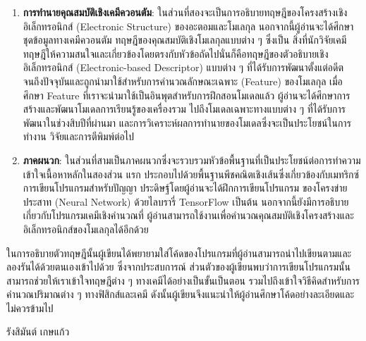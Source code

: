{\begin{enumerate}
    \item \textbf{การทำนายคุณสมบัติเชิงเคมีควอนตัม}: ในส่วนที่สองจะเป็นการอธิบายทฤษฎีของโครงสร้างเชิงอิเล็กทรอนิกส์ (Electronic 
    Structure) ของอะตอมและโมเลกุล นอกจากนี้ผู้อ่านจะได้ศึกษาชุดข้อมูลทางเคมีควอนตัม ทฤษฎีของคุณสมบัติเชิงโมเลกุลแบบต่าง ๆ ซึ่งเป็น%
    สิ่งที่นักวิจัยเคมีทฤษฎีให้ความสนใจและเกี่ยวข้องโดยตรงกับหัวข้อถัดไปนั่นก็คือทฤษฎีของตัวอธิบายเชิงอิเล็กทรอนิกส์ (Electronic-based 
    Descriptor) แบบต่าง ๆ ที่ได้รับการพัฒนาตั้งแต่อดีตจนถึงปัจจุบันและถูกนำมาใช้สำหรับการคำนวณลักษณะเฉพาะ (Feature) ของโมเลกุล 
    เมื่อศึกษา Feature ที่เราจะนำมาใช้เป็นอินพุตสำหรับการฝึกสอนโมเดลแล้ว ผู้อ่านจะได้ศึกษาการสร้างและพัฒนาโมเดลการเรียนรู้ของเครื่องรวม%
    ไปถึงโมเดลเฉพาะทางแบบต่าง ๆ ที่ได้รับการพัฒนาในช่วงสิบปีที่ผ่านมา และการวิเคราะห์ผลการทำนายของโมเดลซึ่งจะเป็นประโยชน์ในการทำงาน%
    วิจัยและการตีพิมพ์ต่อไป

    \item \textbf{ภาคผนวก}: ในส่วนที่สามเป็นภาคผนวกซึ่งจะรวบรวมหัวข้อพื้นฐานที่เป็นประโยชน์ต่อการทำความเข้าใจเนื้อหาหลักในสองส่วน%
    แรก ประกอบไปด้วยพื้นฐานพีชคณิตเชิงเส้นซึ่งเกี่ยวข้องกับเมทริกซ์ การเขียนโปรแกรมสำหรับปัญญา ประดิษฐ์โดยผู้อ่านจะได้ฝึกการเขียนโปรแกรม%
    ของโครงข่ายประสาท (Neural Network) ด้วยไลบรารี่ TensorFlow เป็นต้น นอกจากนี้ยังมีการอธิบายเกี่ยวกับโปรแกรมเคมีเชิงคำนวณที่%
    ผู้อ่านสามารถใช้งานเพื่อคำนวณคุณสมบัติเชิงโครงสร้างและอิเล็กทรอนิกส์ของโมเลกุลได้อีกด้วย
\end{enumerate}

ในการอธิบายตัวทฤษฎีนั้นผู้เขียนได้พยายามใส่โค้ดของโปรแกรมที่ผู้อ่านสามารถนำไปเขียนตามและลองรันได้ด้วยตนเองเข้าไปด้วย ซึ่งจากประสบการณ์%
ส่วนตัวของผู้เขียนพบว่าการเขียนโปรแกรมนั้นสามารถช่วยให้เราเข้าใจทฤษฎีต่าง ๆ ทางเคมีได้อย่างเป็นขั้นเป็นตอน รวมไปถึงเข้าใจวิธีคิดสำหรับการ%
คำนวณปริมาณต่าง ๆ ทางฟิสิกส์และเคมี ดังนั้นผู้เขียนจึงแนะนำให้ผู้อ่านศึกษาโค้ดอย่างละเอียดและไม่ควรข้ามไป

\medskip

\begin{flushright}
รังสิมันต์ เกษแก้ว
\end{flushright}
}
